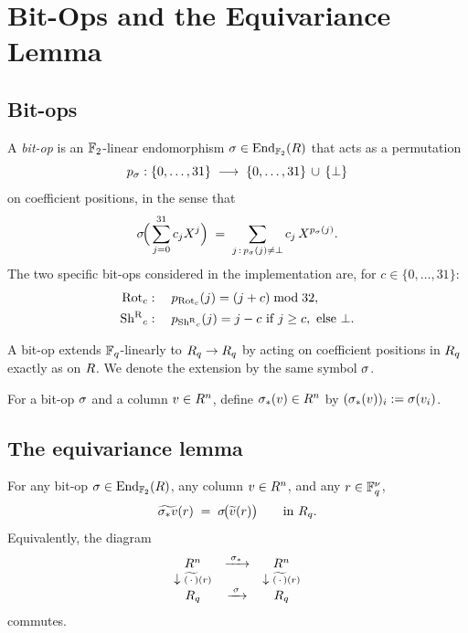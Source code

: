 \section{Bit-Ops and the Equivariance Lemma}
\label{sec:equivariance}

\subsection{Bit-ops}

\begin{definition}[Bit-op]
\label{def:bitop}
A \emph{bit-op} is an $\mathbb{F}_2$-linear endomorphism
$\sigma \in \operatorname{End}_{\mathbb{F}_2}(R)$ that acts as a permutation
\[
  p_{\sigma} : \{0,\ldots,31\} \;\longrightarrow\; \{0,\ldots,31\}\,\cup\,\{\bot\}
\]
on coefficient positions, in the sense that
\[
  \sigma\!\Big(\sum_{j=0}^{31} c_j X^j\Big) \;=\; \sum_{j\,:\,p_{\sigma}(j)\ne\bot} c_j\, X^{p_{\sigma}(j)}.
\]
The two specific bit-ops considered in the implementation are, for $c \in \{0,\ldots,31\}$:
\begin{align*}
  \operatorname{Rot}_c &: \quad p_{\operatorname{Rot}_c}(j) = (j+c) \bmod 32, \\
  \operatorname{Sh^{R}}_c &: \quad p_{\operatorname{Sh^{R}}_c}(j) = j-c \text{ if } j \ge c, \text{ else } \bot.
\end{align*}
\end{definition}

\begin{remark}
\label{rem:lift}
A bit-op extends $\mathbb{F}_q$-linearly to $R_q \to R_q$ by acting
on coefficient positions in $R_q$ exactly as on $R$. We
denote the extension by the same symbol $\sigma$.
\end{remark}

\begin{definition}
For a bit-op $\sigma$ and a column $v \in R^n$, define
$\sigma_*(v) \in R^n$ by $(\sigma_*(v))_i := \sigma(v_i)$.
\end{definition}

\subsection{The equivariance lemma}

\begin{lemma}
\label{lem:equivariance}
For any bit-op $\sigma \in \operatorname{End}_{\mathbb{F}_2}(R)$, any column
$v \in R^n$, and any $r \in \mathbb{F}_q^{\nu}$,
\begin{equation}
\label{eq:equivariance}
  \widetilde{\sigma_* v}(r) \;=\; \sigma\!\big(\widetilde{v}(r)\big) \qquad \text{in } R_q.
\end{equation}
Equivalently, the diagram
\[
\begin{array}{ccc}
  R^n & \xrightarrow{\;\sigma_*\;} & R^n \\
  \downarrow{\scriptstyle \widetilde{(\,\cdot\,)}(r)} & & \downarrow{\scriptstyle \widetilde{(\,\cdot\,)}(r)} \\
  R_q & \xrightarrow{\;\sigma\;} & R_q
\end{array}
\]
commutes.
\end{lemma}

